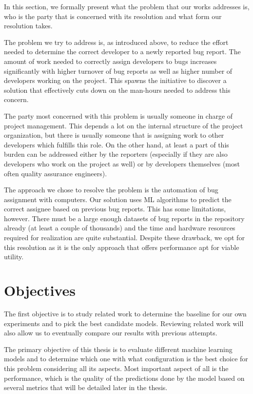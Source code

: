 In this section, we formally present what the problem that our works addresses is, who is the party that is concerned with its resolution and what form our resolution takes.

The problem we try to address is, as introduced above, to reduce the effort needed to determine the correct developer to a newly reported bug report. The amount of work needed to correctly assign developers to bugs increases significantly with higher turnover of bug reports as well as higher number of developers working on the project. This spawns the initiative to discover a solution that effectively cuts down on the man-hours needed to address this concern.

The party most concerned with this problem is usually someone in charge of project management. This depends a lot on the internal structure of the project organization, but there is usually someone that is assigning work to other developers which fulfills this role. On the other hand, at least a part of this burden can be addressed either by the reporters (especially if they are also developers who work on the project as well) or by developers themselves (most often quality assurance engineers).

The approach we chose to resolve the problem is the automation of bug assignment with computers. Our solution uses ML algorithms to predict the correct assignee based on previous bug reports. This has some limitations, however. There must be a large enough datasets of bug reports in the repository already (at least a couple of thousands) and the time and hardware resources required for realization are quite substantial. Despite these drawback, we opt for this resolution as it is the only approach that offers performance apt for viable utility.

\section{Objectives}

The first objective is to study related work to determine the baseline for our own experiments and to pick the best candidate models. Reviewing related work will also allow us to eventually compare our results with previous attempts.

The primary objective of this thesis is to evaluate different machine learning models and to determine which one with what configuration is the best choice for this problem considering all its aspects. Most important aspect of all is the performance, which is the quality of the predictions done by the model based on several metrics that will be detailed later in the thesis.

